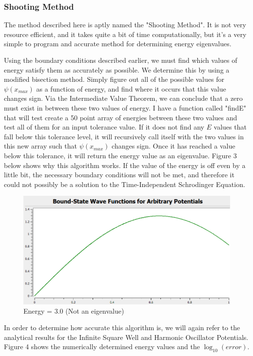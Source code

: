 \documentclass[11pt]{article} %
\begin{document}
\subsubsection{Shooting Method}
The method described here is aptly named the "Shooting Method". It is not very resource efficient, and it takes quite a bit of time computationally, but it's a very simple to program and accurate method for determining energy eigenvalues. 
\par Using the boundary conditions described earlier, we must find which values of energy satisfy them as accurately as possible. We determine this by using a modified bisection method. Simply figure out all of the possible values for $\psi (x_{max})$ as a function of energy, and find where it occurs that this value changes sign. Via the Intermediate Value Theorem, we can conclude that a zero must exist in between these two values of energy. I have a function called "findE" that will test create a 50 point array of energies between these two values and test all of them for an input tolerance value. If it does not find any $E$ values that fall below this tolerance level, it will recursively call itself with the two values in this new array such that $\psi (x_{max})$ changes sign.  Once it has reached a value below this tolerance, it will return the energy value as an eigenvalue. Figure 3 below shows why this algorithm works. If the value of the energy is off even by a little bit, the necessary boundary conditions will not be met, and therefore it could not possibly be a solution to the Time-Independent Schrodinger Equation. 
\begin{figure}
\centering
\includegraphics[scale = .5]{fp3}
\caption{Energy = 3.0 (Not an eigenvalue)}
\end{figure}
In order to determine how accurate this algorithm is, we will again refer to the analytical results for the Infinite Square Well and Harmonic Oscillator Potentials.  Figure 4 shows the numerically determined energy values and the $\log _{10} (error)$. 
\end{document}
